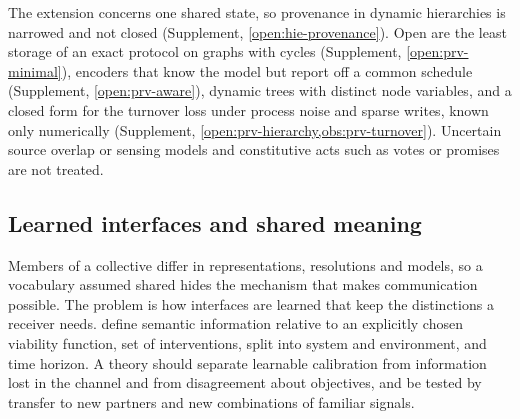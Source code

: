The extension concerns one shared state, so provenance in dynamic hierarchies is narrowed and not closed (Supplement, \cref{open:hie-provenance}). Open are the least storage of an exact protocol on graphs with cycles (Supplement, \cref{open:prv-minimal}), encoders that know the model but report off a common schedule (Supplement, \cref{open:prv-aware}), dynamic trees with distinct node variables, and a closed form for the turnover loss under process noise and sparse writes, known only numerically (Supplement, \cref{open:prv-hierarchy,obs:prv-turnover}). Uncertain source overlap or sensing models and constitutive acts such as votes or promises are not treated.

\subsection{Learned interfaces and shared meaning}\label{sec:opn-6}

Members of a collective differ in representations, resolutions and models, so a vocabulary assumed shared hides the mechanism that makes communication possible. The problem is how interfaces are learned that keep the distinctions a receiver needs. \citet{kolchinsky2018semantic} define semantic information relative to an explicitly chosen viability function, set of interventions, split into system and environment, and time horizon. A theory should separate learnable calibration from information lost in the channel and from disagreement about objectives, and be tested by transfer to new partners and new combinations of familiar signals.

